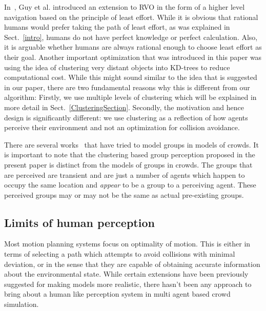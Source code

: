 \documentclass[runningheads,a4paper]{llncs}
\begin{document}
In~\cite{Guy:2010uv}, Guy et al. introduced an extension to RVO in the form of a higher level navigation based on the principle of least effort. While it is obvious that rational humans would prefer taking the path of least effort, as was explained in Sect.~\ref{intro}, humans do not have perfect knowledge or perfect calculation. Also, it is arguable whether humans are always rational enough to choose least effort as their goal. Another important optimization that was introduced in this paper was using the idea of clustering very distant objects into KD-trees to reduce computational cost. While this might sound similar to the idea that is suggested in our paper, there are two fundamental reasons why this is different from our algorithm: Firstly, we use multiple levels of clustering which will be explained in more detail in Sect.~\ref{ClusteringSection}. Secondly, the motivation and hence design is significantly different: we use clustering as a reflection of how agents perceive their environment and not an optimization for collision avoidance.

There are several works~\cite{Kamphuis:2004uu,Qiu:2008ww} that have tried to model groups in models of crowds. It is important to note that the clustering based group perception proposed in the present paper is distinct from the models of groups in crowds. The groups that are perceived are transient and are just a number of agents which happen to occupy the same location and \emph{appear} to be a group to a perceiving agent. These perceived groups may or may not be the same as actual pre-existing groups.


\subsection{Limits of human perception}
\label{ReviewPerception}
Most motion planning systems focus on optimality of motion. This is either in terms of selecting a path which attempts to avoid collisions with minimal deviation, or in the sense that they are capable of obtaining accurate information about the environmental state. While certain extensions have been previously suggested for making models more realistic, there hasn't been any approach to bring about a human like perception system in multi agent based crowd simulation. 
\end{document}
